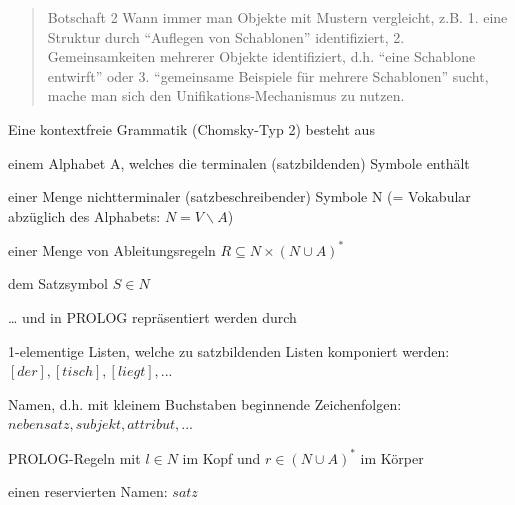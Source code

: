\documentclass[a4paper]{article}
\begin{document}
\begin{multicols}{3}
  \begin{quote}
    Botschaft 2 Wann immer man Objekte mit Mustern vergleicht, z.B. 1. eine
    Struktur durch ``Auflegen von Schablonen'' identifiziert, 2.
    Gemeinsamkeiten mehrerer Objekte identifiziert, d.h. ``eine Schablone
    entwirft'' oder 3. ``gemeinsame Beispiele für mehrere Schablonen''
    sucht, mache man sich den Unifikations-Mechanismus zu nutzen.
  \end{quote}

  \begin{itemize*}
    \itemsep1pt\parskip0pt
    \item
          Eine kontextfreie Grammatik (Chomsky-Typ 2) besteht aus
  \end{itemize*}

  \begin{enumerate*}
    \itemsep1pt\parskip0pt
    \item
          einem Alphabet A, welches die terminalen (satzbildenden) Symbole
          enthält
    \item
          einer Menge nichtterminaler (satzbeschreibender) Symbole N (=
          Vokabular abzüglich des Alphabets: $N = V \backslash A$)
    \item
          einer Menge von Ableitungsregeln $R\subseteq N\times (N\cup A)^*$
    \item
          dem Satzsymbol $S\in N$
  \end{enumerate*}

  \begin{itemize*}
    \itemsep1pt\parskip0pt
    \item
          \ldots{} und in PROLOG repräsentiert werden durch
  \end{itemize*}

  \begin{enumerate*}
    \itemsep1pt\parskip0pt
    \item
          1-elementige Listen, welche zu satzbildenden Listen komponiert werden:
          $[der],[tisch],[liegt],...$
    \item
          Namen, d.h. mit kleinem Buchstaben beginnende Zeichenfolgen:
          $nebensatz,subjekt,attribut,...$
    \item
          PROLOG-Regeln mit $l\in N$ im Kopf und $r\in(N\cup A)^*$ im Körper
    \item
          einen reservierten Namen: $satz$
  \end{enumerate*}


\end{multicols}
\end{document}
